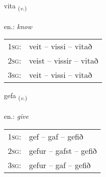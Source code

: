 \documentclass[frontgrid, backgrid]{flacards}\usepackage[]{graphicx}\usepackage[]{xcolor}
\begin{document}
\renewcommand{\flhead}{\vskip5pt \fboxsep=0pt {\small\bfseries\footnotesize Sagnorð | Verb}}
\renewcommand{\fcfoot}{\vskip5pt \fboxsep=0pt \hspace{2pt}{\small\bfseries\footnotesize 1K}}

\renewcommand{\blhead}{\vskip5pt {\small\bfseries\footnotesize Sagnorð | Verb }}
\renewcommand{\bcfoot}{\vskip5pt \hspace{2pt}{\small\bfseries\footnotesize 1K}}


{vita \small{\textsubscript{(\textit{v.})}} \\[1ex] %
\textphonetic{[vɪːta]} \\
en.: \emph{know} \\  [2ex]
\renewcommand*{\arraystretch}{0.8}
\begin{tabular}{p{1cm}l}
\textsc{1sg}: & veit -- vissi -- vitað \\ 
\textsc{2sg}: & veist -- vissir -- vitað \\ 
\textsc{3sg}: & veit -- vissi -- vitað \\ 
\end{tabular}
}

\renewcommand{\flhead}{\vskip5pt \fboxsep=0pt {\small\bfseries\footnotesize Sagnorð | Verb}}
\renewcommand{\fcfoot}{\vskip5pt \fboxsep=0pt \hspace{2pt}{\small\bfseries\footnotesize 1K}}

\renewcommand{\blhead}{\vskip5pt {\small\bfseries\footnotesize Sagnorð | Verb }}
\renewcommand{\bcfoot}{\vskip5pt \hspace{2pt}{\small\bfseries\footnotesize 1K}}


{gefa \small{\textsubscript{(\textit{v.})}} \\[1ex] %
\textphonetic{[cɛːva]} \\
en.: \emph{give} \\  [2ex]
\renewcommand*{\arraystretch}{0.8}
\begin{tabular}{p{1cm}l}
\textsc{1sg}: & gef -- gaf -- gefið \\ 
\textsc{2sg}: & gefur -- gafst -- gefið \\ 
\textsc{3sg}: & gefur -- gaf -- gefið \\ 
\end{tabular}
}
\end{document}
